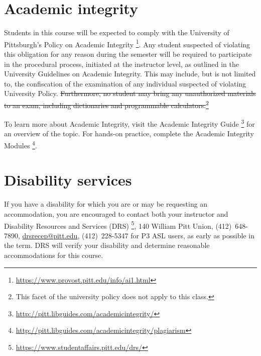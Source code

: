 \documentclass[12pt]{article}
\begin{document}
\section{Academic integrity}

Students in this course %
will be expected to comply with %
the University of Pittsburgh's %
Policy on Academic Integrity%
\footnote{\url{https://www.provost.pitt.edu/info/ai1.html}}.
%
Any student suspected of violating this obligation %
for any reason during the semester %
will be required to participate in the procedural process, %
initiated at the instructor level, %
as outlined in the University Guidelines on Academic Integrity.
%
This may include, %
but is not limited to, %
the confiscation of the examination %
of any individual suspected of violating University Policy.
%
\st{Furthermore, %
no student may bring any unauthorized materials to an exam, %
including dictionaries and programmable calculators.}\footnote{%
This facet of the university policy does not apply to this class.}

To learn more about Academic Integrity, %
visit the Academic Integrity Guide%
\footnote{\url{http://pitt.libguides.com/academicintegrity/}} %
for an overview of the topic.
%
For hands-on practice, %
complete the Academic Integrity Modules%
\footnote{\url{http://pitt.libguides.com/academicintegrity/plagiarism}}.

\section{Disability services}

If you have a disability %
for which you are or may be requesting an accommodation, %
you are encouraged to contact %
both your instructor and Disability Resources and Services (DRS)%
\footnote{\url{https://www.studentaffairs.pitt.edu/drs/}}, %
140 William Pitt Union, %
(412)~648-7890, %
\href{mailto:drsrecep@pitt.edu}{drsrecep@pitt.edu}, %
(412)~228-5347 for P3 ASL users, %
as early as possible in the term.
%
DRS will verify your disability %
and determine reasonable accommodations for this course.

\label{mylastpage}              %
\newpage
\appendix
\setcounter{page}{1}
\renewcommand{\thepage}{\arabic{page}}
\fancyhead[r]{Appendix Page \thepage{} of~\pageref*{mylastappendixpage}}
\printbibliography[heading=none]{}%
\label{mylastappendixpage}
\end{document}

